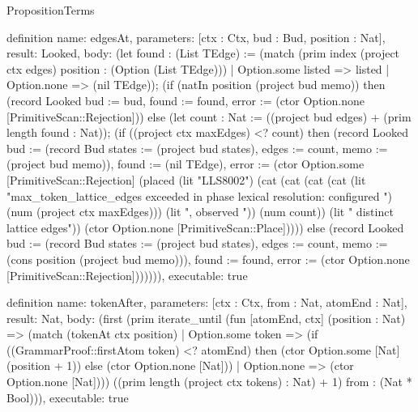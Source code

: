 \begin{lexlean}{PropositionTerms}
\begin{semanticmodule}
definition{
  name: edgesAt,
  parameters: [ctx : Ctx, bud : Bud, position : Nat],
  result: Looked,
  body: (let found : (List TEdge) := (match (prim index (project ctx edges) position : (Option (List TEdge)))
    | Option.some listed => listed
    | Option.none => (nil TEdge)); (if (natIn position (project bud memo)) then (record Looked {bud := bud, found := found, error := (ctor Option.none [PrimitiveScan::Rejection])}) else (let count : Nat := ((project bud edges) + (prim length found : Nat)); (if ((project ctx maxEdges) <? count) then (record Looked {bud := (record Bud {states := (project bud states), edges := count, memo := (project bud memo)}), found := (nil TEdge), error := (ctor Option.some [PrimitiveScan::Rejection] (placed (lit "LLS8002") (cat (cat (cat (cat (lit "max_token_lattice_edges exceeded in phase lexical resolution: configured ") (num (project ctx maxEdges))) (lit ", observed ")) (num count)) (lit " distinct lattice edges")) (ctor Option.none [PrimitiveScan::Place])))}) else (record Looked {bud := (record Bud {states := (project bud states), edges := count, memo := (cons position (project bud memo))}), found := found, error := (ctor Option.none [PrimitiveScan::Rejection])}))))),
  executable: true
}

definition{
  name: tokenAfter,
  parameters: [ctx : Ctx, from : Nat, atomEnd : Nat],
  result: Nat,
  body: (first (prim iterate_until (fun [atomEnd, ctx] (position : Nat) => (match (tokenAt ctx position)
    | Option.some token => (if ((GrammarProof::firstAtom token) <? atomEnd) then (ctor Option.some [Nat] (position + 1)) else (ctor Option.none [Nat]))
    | Option.none => (ctor Option.none [Nat]))) ((prim length (project ctx tokens) : Nat) + 1) from : (Nat * Bool))),
  executable: true
}


\end{semanticmodule}
\end{lexlean}
